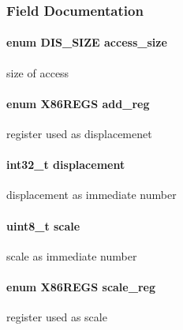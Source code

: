 \subsubsection{Field Documentation}
\hypertarget{struct_d_i_s__mem__arg_abe85ed51a3596cdb3a868a284c3d961f}{
\paragraph[{access\_\-size}]{\setlength{\rightskip}{0pt plus 5cm}enum {\bf DIS\_\-SIZE} {\bf access\_\-size}}}
\label{struct_d_i_s__mem__arg_abe85ed51a3596cdb3a868a284c3d961f}
size of access \hypertarget{struct_d_i_s__mem__arg_abdbd08c3d265ff494ad5ff1006cc6a73}{
\paragraph[{add\_\-reg}]{\setlength{\rightskip}{0pt plus 5cm}enum {\bf X86REGS} {\bf add\_\-reg}}}
\label{struct_d_i_s__mem__arg_abdbd08c3d265ff494ad5ff1006cc6a73}
register used as displacemenet \hypertarget{struct_d_i_s__mem__arg_a241d2c58aca95f8589148d4acf97406d}{
\paragraph[{displacement}]{\setlength{\rightskip}{0pt plus 5cm}int32\_\-t {\bf displacement}}}
\label{struct_d_i_s__mem__arg_a241d2c58aca95f8589148d4acf97406d}
displacement as immediate number \hypertarget{struct_d_i_s__mem__arg_a616c0a72f0e4af38b93c736773ac7210}{
\paragraph[{scale}]{\setlength{\rightskip}{0pt plus 5cm}uint8\_\-t {\bf scale}}}
\label{struct_d_i_s__mem__arg_a616c0a72f0e4af38b93c736773ac7210}
scale as immediate number \hypertarget{struct_d_i_s__mem__arg_afb3d2d6aee6f877fd62b8ffc576d9351}{
\paragraph[{scale\_\-reg}]{\setlength{\rightskip}{0pt plus 5cm}enum {\bf X86REGS} {\bf scale\_\-reg}}}
\label{struct_d_i_s__mem__arg_afb3d2d6aee6f877fd62b8ffc576d9351}
register used as scale 